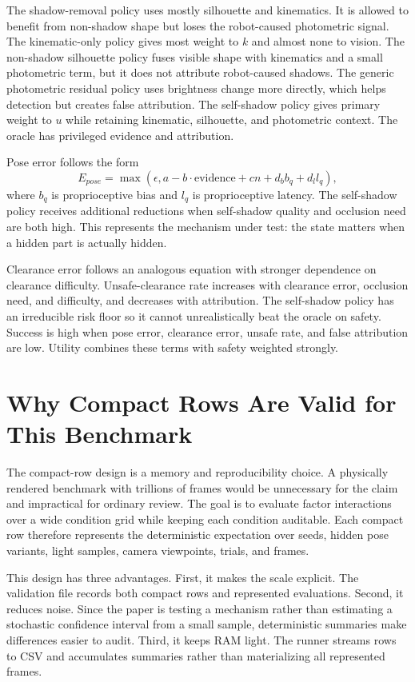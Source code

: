 \documentclass{article}
\begin{document}
The shadow-removal policy uses mostly silhouette and kinematics. It is allowed to benefit from non-shadow shape but loses the robot-caused photometric signal. The kinematic-only policy gives most weight to $k$ and almost none to vision. The non-shadow silhouette policy fuses visible shape with kinematics and a small photometric term, but it does not attribute robot-caused shadows. The generic photometric residual policy uses brightness change more directly, which helps detection but creates false attribution. The self-shadow policy gives primary weight to $u$ while retaining kinematic, silhouette, and photometric context. The oracle has privileged evidence and attribution.

Pose error follows the form
\[
E_{pose} = \max(\epsilon, a - b \cdot \mathrm{evidence} + c n + d_b b_q + d_l l_q),
\]
where $b_q$ is proprioceptive bias and $l_q$ is proprioceptive latency. The self-shadow policy receives additional reductions when self-shadow quality and occlusion need are both high. This represents the mechanism under test: the state matters when a hidden part is actually hidden.

Clearance error follows an analogous equation with stronger dependence on clearance difficulty. Unsafe-clearance rate increases with clearance error, occlusion need, and difficulty, and decreases with attribution. The self-shadow policy has an irreducible risk floor so it cannot unrealistically beat the oracle on safety. Success is high when pose error, clearance error, unsafe rate, and false attribution are low. Utility combines these terms with safety weighted strongly.

\section{Why Compact Rows Are Valid for This Benchmark}

The compact-row design is a memory and reproducibility choice. A physically rendered benchmark with trillions of frames would be unnecessary for the claim and impractical for ordinary review. The goal is to evaluate factor interactions over a wide condition grid while keeping each condition auditable. Each compact row therefore represents the deterministic expectation over seeds, hidden pose variants, light samples, camera viewpoints, trials, and frames.

This design has three advantages. First, it makes the scale explicit. The validation file records both compact rows and represented evaluations. Second, it reduces noise. Since the paper is testing a mechanism rather than estimating a stochastic confidence interval from a small sample, deterministic summaries make differences easier to audit. Third, it keeps RAM light. The runner streams rows to CSV and accumulates summaries rather than materializing all represented frames.
\end{document}
